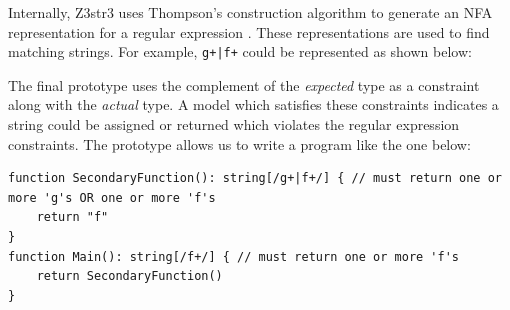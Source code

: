 \documentclass[a4paper]{article}
\begin{document}


Internally, Z3str3 uses Thompson's construction algorithm to generate an NFA representation for a regular expression \citep{z3nfa}. These representations are used to find matching strings. For example, \texttt{g+|f+} could be represented as shown below:

\begin{center}
\end{center}

The final prototype uses the complement of the \emph{expected} type as a constraint along with the \emph{actual} type. A model which satisfies these constraints indicates a string could be assigned or returned which violates the regular expression constraints. The prototype allows us to write a program like the one below:

\begin{verbatim}
function SecondaryFunction(): string[/g+|f+/] { // must return one or more 'g's OR one or more 'f's
    return "f"
}
function Main(): string[/f+/] { // must return one or more 'f's
    return SecondaryFunction()
}
\end{verbatim}
\end{document}
